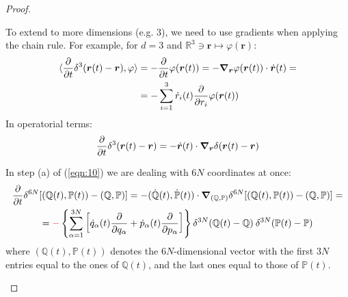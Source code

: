 \documentclass[../template.tex]{subfiles}
\begin{document}
\begin{proof}
\begin{expl}
    To extend to more dimensions (e.g. $3$), we need to use gradients when applying the chain rule. For example, for $d=3$ and $\mathbb{R}^3 \ni \bm{r} \mapsto \varphi(\bm{r})$:
    \begin{align*}
        \langle \pdv{t} \delta^3(\bm{r}(t) - \bm{r}), \varphi\rangle &= -\pdv{t} \varphi(\bm{r}(t)) = -\grad_{\bm{r}} \varphi(\bm{r}(t)) \cdot \dot{\bm{r}}(t) =\\
        &= - \sum_{i=1}^3 \dot{r}_i(t) \pdv{r_i} \varphi(\bm{r}(t))
    \end{align*}
    In operatorial terms:
    \begin{align*}
        \pdv{t}\delta^3(\bm{r}(t)-\bm{r}) = -\dot{\bm{r}}(t) \cdot \grad_{\bm{r}} \delta(\bm{r}(t) - \bm{r})
    \end{align*}

    In step (a) of (\ref{eqn:10}) we are dealing with $6N$ coordinates at once:
    \begin{align*}
        \pdv{t} \delta^{6N}[(\mathbb{Q}(t), \mathbb{P}(t)) - (\mathbb{Q},\mathbb{P})] &= -(\dot{\mathbb{Q}}(t), \dot{\mathbb{P}}(t)) \cdot \grad_{(\bm{\mathbb{Q}}, \bm{\mathbb{P}})} \delta^{6N}[(\mathbb{Q}(t), \mathbb{P}(t)) - (\mathbb{Q},\mathbb{P})] =\\
        =\textcolor{Red}{-} \left\{\sum_{\alpha=1}^{3N} \left[\dot{q}_\alpha(t) \pdv{q_\alpha} + \dot{p}_\alpha(t) \pdv{p_\alpha}\right] \right\} \delta^{3N}(\mathbb{Q}(t) - \mathbb{Q}) \>  \delta^{3N}(\mathbb{P}(t) - \mathbb{P}) \span
    \end{align*}
    where $(\mathbb{Q}(t), \mathbb{P}(t))$ denotes the $6N$-dimensional vector with the first $3N$ entries equal to the ones of $\mathbb{Q}(t)$, and the last ones equal to those of $\mathbb{P}(t)$.
        
    \end{expl}


\end{proof}
\end{document}
